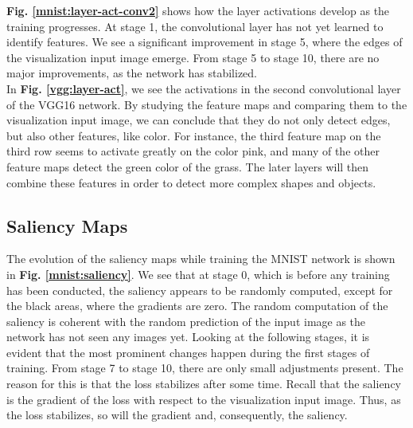 \noindent \textbf{Fig. \ref{mnist:layer-act-conv2}} shows how the layer activations develop as the training progresses. At stage 1, the convolutional layer has not yet learned to identify features. We see a significant improvement in stage 5, where the edges of the visualization input image emerge. From stage 5 to stage 10, there are no major improvements, as the network has stabilized. \\

\noindent In \textbf{Fig. \ref{vgg:layer-act}}, we see the activations in the second convolutional layer of the VGG16 network. By studying the feature maps and comparing them to the visualization input image, we can conclude that they do not only detect edges, but also other features, like color. For instance, the third feature map on the third row seems to activate greatly on the color pink, and many of the other feature maps detect the green color of the grass. The later layers will then combine these features in order to detect more complex shapes and objects.


\subsection{Saliency Maps}

The evolution of the saliency maps while training the MNIST network is shown in \textbf{Fig. \ref{mnist:saliency}}. We see that at stage 0, which is before any training has been conducted, the saliency appears to be randomly computed, except for the black areas, where the gradients are zero. The random computation of the saliency is coherent with the random prediction of the input image as the network has not seen any images yet. Looking at the following stages, it is evident that the most prominent changes happen during the first stages of training. From stage 7 to stage 10, there are only small adjustments present. The reason for this is that the loss stabilizes after some time. Recall that the saliency is the gradient of the loss with respect to the visualization input image. Thus, as the loss stabilizes, so will the gradient and, consequently, the saliency. \\

